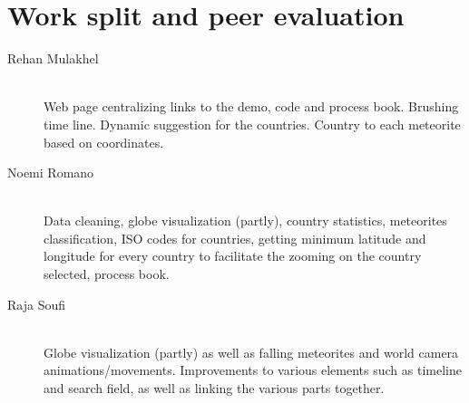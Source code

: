 \documentclass[10pt,conference,compsocconf]{IEEEtran}
\begin{document}
\section{Work split and peer evaluation}
\label{sec:work_split}

\begin{description}
\item[Rehan Mulakhel] \ \\
  Web page centralizing links to the demo, code and process book. Brushing time line. Dynamic suggestion for the countries. Country to each meteorite based on coordinates. 
\item[Noemi Romano] \ \\
  Data cleaning, globe visualization (partly), country statistics, meteorites classification, ISO codes for countries, getting minimum latitude and longitude for every country to facilitate the zooming on the country selected, process book.  
\item[Raja Soufi] \ \\
  Globe visualization (partly) as well as falling meteorites and world camera animations/movements.
  Improvements to various elements such as timeline and search field, as well as linking the various parts together.
\end{description}






\end{document}
